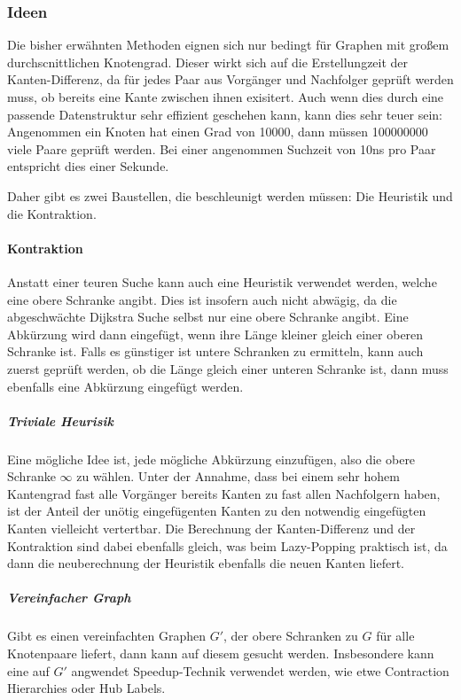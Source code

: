 \subsubsection{Ideen}

Die bisher erwähnten Methoden eignen sich nur bedingt für Graphen mit großem durchscnittlichen Knotengrad.
Dieser wirkt sich auf die Erstellungzeit der Kanten-Differenz, da für jedes Paar aus Vorgänger und Nachfolger geprüft werden muss, ob bereits eine Kante zwischen ihnen exisitert.
Auch wenn dies durch eine passende Datenstruktur sehr effizient geschehen kann, kann dies sehr teuer sein:
Angenommen ein Knoten hat einen Grad von \num{10000}, dann müssen \num{100000000} viele Paare geprüft werden.
Bei einer angenommen Suchzeit von \num{10}\unit{\ns} pro Paar entspricht dies einer Sekunde.


Daher gibt es zwei Baustellen, die beschleunigt werden müssen:
Die Heuristik und die Kontraktion.

\paragraph{Kontraktion}
Anstatt einer teuren Suche kann auch eine Heuristik verwendet werden, welche eine obere Schranke angibt.
Dies ist insofern auch nicht abwägig, da die abgeschwächte Dijkstra Suche selbst nur eine obere Schranke angibt.
Eine Abkürzung wird dann eingefügt, wenn ihre Länge kleiner gleich einer oberen Schranke ist.
Falls es günstiger ist untere Schranken zu ermitteln, kann auch zuerst geprüft werden, ob die Länge gleich einer unteren Schranke ist, dann muss ebenfalls eine Abkürzung eingefügt werden.

\subparagraph{Triviale Heurisik}
Eine mögliche Idee ist, jede mögliche Abkürzung einzufügen, also die obere Schranke $\infty$ zu wählen.
Unter der Annahme, dass bei einem sehr hohem Kantengrad fast alle Vorgänger bereits Kanten zu fast allen Nachfolgern haben, ist der Anteil der unötig eingefügenten Kanten zu den notwendig eingefügten Kanten vielleicht vertertbar.
Die Berechnung der Kanten-Differenz und der Kontraktion sind dabei ebenfalls gleich, was beim Lazy-Popping praktisch ist, da dann die neuberechnung der Heuristik ebenfalls die neuen Kanten liefert.

\subparagraph{Vereinfacher Graph}
Gibt es einen vereinfachten Graphen $G'$, der obere Schranken zu $G$ für alle Knotenpaare liefert, dann kann auf diesem gesucht werden.
Insbesondere kann eine auf $G'$ angwendet Speedup-Technik verwendet werden, wie etwe Contraction Hierarchies oder Hub Labels.

